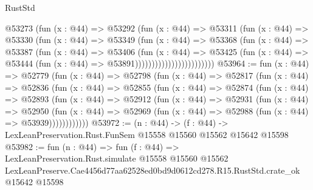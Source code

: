 \begin{lexlean}{RustStd}
\begin{coremodule}
                              @53273
                                (fun (x : @44) =>
                                @53292
                                  (fun (x : @44) =>
                                  @53311
                                    (fun (x : @44) =>
                                    @53330
                                      (fun (x : @44) =>
                                      @53349
                                        (fun (x : @44) =>
                                        @53368
                                          (fun (x : @44) =>
                                          @53387
                                            (fun (x : @44) =>
                                            @53406
                                              (fun (x : @44) =>
                                              @53425
                                                (fun (x : @44) =>
                                                @53444
                                                  (fun (x : @44) => @53891))))))))))))))))))))))))
@53964 := fun (x : @44) =>
  @52779
    (fun (x : @44) =>
    @52798
      (fun (x : @44) =>
      @52817
        (fun (x : @44) =>
        @52836
          (fun (x : @44) =>
          @52855
            (fun (x : @44) =>
            @52874
              (fun (x : @44) =>
              @52893
                (fun (x : @44) =>
                @52912
                  (fun (x : @44) =>
                  @52931
                    (fun (x : @44) =>
                    @52950
                      (fun (x : @44) =>
                      @52969 (fun (x : @44) => @52988 (fun (x : @44) => @53939))))))))))))
@53972 := (n : @44) ->
  (f : @44) -> LexLeanPreservation.Rust.FunSem @15558 @15560 @15562 @15642 @15598
@53982 := fun (n : @44) =>
  fun (f : @44) =>
  LexLeanPreservation.Rust.simulate
    @15558
    @15560
    @15562
    LexLeanPreserve.Cae4456d77aa62528ed0bd9d0612cd278.R15.RustStd.crate_ok
    @15642
    @15598
\end{coremodule}
\end{lexlean}
